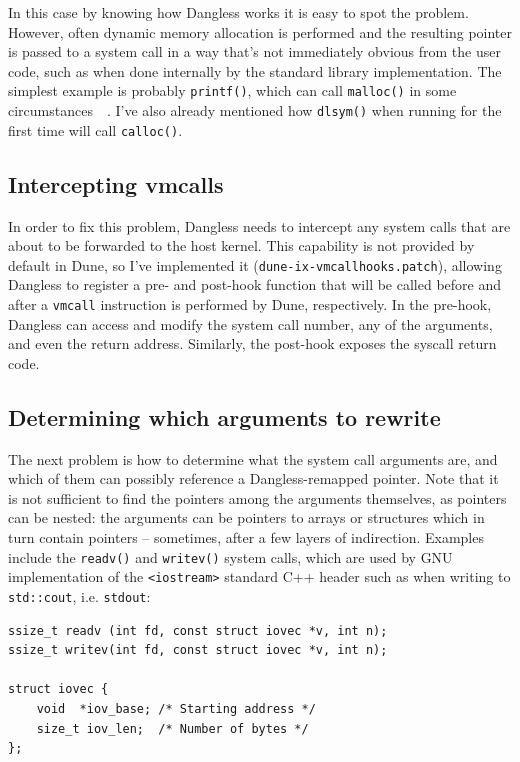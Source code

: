 In this case by knowing how Dangless works it is easy to spot the problem. However, often dynamic memory allocation is performed and the resulting pointer is passed to a system call in a way that's not immediately obvious from the user code, such as when done internally by the standard library implementation. The simplest example is probably \lstinline!printf()!, which can call \lstinline!malloc()! in some circumstances~\cite{glibc-printf-malloc}~\cite{glibc-printf-malloc-vulnerability}. I've also already mentioned how \lstinline!dlsym()! when running for the first time will call \lstinline!calloc()!.

\subsection{Intercepting vmcalls}

In order to fix this problem, Dangless needs to intercept any system calls that are about to be forwarded to the host kernel. This capability is not provided by default in Dune, so I've implemented it (\texttt{dune-ix-vmcallhooks.patch}), allowing Dangless to register a pre- and post-hook function that will be called before and after a \lstinline!vmcall! instruction is performed by Dune, respectively. In the pre-hook, Dangless can access and modify the system call number, any of the arguments, and even the return address. Similarly, the post-hook exposes the syscall return code.

\subsection{Determining which arguments to rewrite}

The next problem is how to determine what the system call arguments are, and which of them can possibly reference a Dangless-remapped pointer. Note that it is not sufficient to find the pointers among the arguments themselves, as pointers can be nested: the arguments can be pointers to arrays or structures which in turn contain pointers -- sometimes, after a few layers of indirection. Examples include the \lstinline!readv()! and \lstinline!writev()! system calls, which are used by GNU implementation of the \lstinline!<iostream>! standard C++ header such as when writing to \lstinline!std::cout!, i.e. \lstinline!stdout!:

\begin{lstlisting}
ssize_t readv (int fd, const struct iovec *v, int n);
ssize_t writev(int fd, const struct iovec *v, int n);

struct iovec {
	void  *iov_base; /* Starting address */
	size_t iov_len;  /* Number of bytes */
};
\end{lstlisting}

